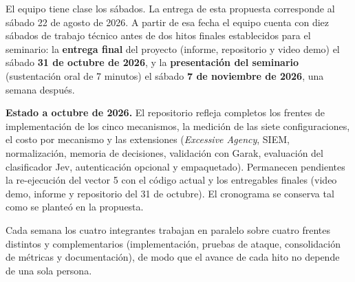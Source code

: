 \documentclass[11pt,letterpaper]{article}
\begin{document}
El equipo tiene clase los sábados. La entrega de esta propuesta corresponde al sábado 22 de agosto de 2026. A partir de esa fecha el equipo cuenta con diez sábados de trabajo técnico antes de dos hitos finales establecidos para el seminario: la \textbf{entrega final} del proyecto (informe, repositorio y video demo) el sábado \textbf{31 de octubre de 2026}, y la \textbf{presentación del seminario} (sustentación oral de 7 minutos) el sábado \textbf{7 de noviembre de 2026}, una semana después.

\textbf{Estado a octubre de 2026.} El repositorio refleja completos los frentes de implementación de los cinco mecanismos, la medición de las siete configuraciones, el costo por mecanismo y las extensiones (\emph{Excessive Agency}, SIEM, normalización, memoria de decisiones, validación con Garak, evaluación del clasificador Jev, autenticación opcional y empaquetado). Permanecen pendientes la re-ejecución del vector 5 con el código actual y los entregables finales (video demo, informe y repositorio del 31 de octubre). El cronograma se conserva tal como se planteó en la propuesta.

Cada semana los cuatro integrantes trabajan en paralelo sobre cuatro frentes distintos y complementarios (implementación, pruebas de ataque, consolidación de métricas y documentación), de modo que el avance de cada hito no depende de una sola persona.
\end{document}

